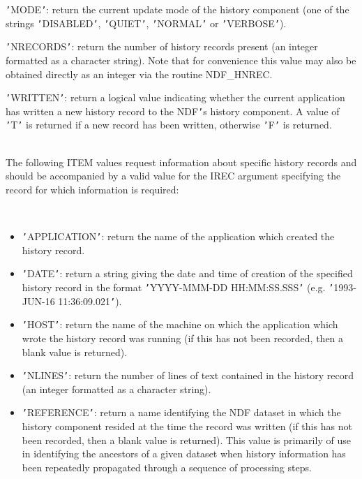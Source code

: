 \documentclass[twoside,11pt]{article}
\newcommand{\htmlref}[2]{#1}
\newcommand{\hi}[1]{{\tt{#1}}}
\newcommand{\sstdiytopic}[2]{\item[{\hspace{-0.35em}#1\hspace{-0.35em}:}]
\mbox{} \\[1.3ex] #2}
\newcommand{\sstitemlist}[1]{
  \mbox{} \\
  \vspace{-3.5ex}
  \begin{itemize}
     #1
  \end{itemize}
}
\newcommand{\sstitem}{\item}
\newcommand{\sstdiytopic}[2]{\item[{#1}] #2 }
\newcommand{\sstitemlist}[1]{
      \begin{itemize}
         #1
      \end{itemize}
      \\
   }
\newcommand{\sstitem}{\item}
\begin{document}
{{{         \sstitem
         \hi{'}MODE\hi{'}: return the current update mode of the history
         component (one of the strings \hi{'}DISABLED\hi{'}, \hi{'}QUIET\hi{'}, \hi{'}NORMAL\hi{'} or
         \hi{'}VERBOSE\hi{'}).

         \sstitem
         \hi{'}NRECORDS\hi{'}: return the number of history records present (an
         integer formatted as a character string). Note that for
         convenience this value may also be obtained directly as an
         integer via the routine \htmlref{NDF\_HNREC}{NDF_HNREC}.

         \sstitem
         \hi{'}WRITTEN\hi{'}: return a logical value indicating whether the
         current application has written a new history record to the NDF\hi{'}s
         history component. A value of \hi{'}T\hi{'} is returned if a new record has
         been written, otherwise \hi{'}F\hi{'} is returned.
      }
   }
   \sstdiytopic{
      Specific Items
   }{
      The following ITEM values request information about specific
      history records and should be accompanied by a valid value for
      the IREC argument specifying the record for which information is
      required:
      \sstitemlist{

         \sstitem
         \hi{'}APPLICATION\hi{'}: return the name of the application which
         created the history record.

         \sstitem
         \hi{'}DATE\hi{'}: return a string giving the date and time of creation
         of the specified history record in the format \hi{'}YYYY-MMM-DD
         HH:MM:SS.SSS\hi{'} (e.g. \hi{'}1993-JUN-16 11:36:09.021\hi{'}).

         \sstitem
         \hi{'}HOST\hi{'}: return the name of the machine on which the
         application which wrote the history record was running (if this
         has not been recorded, then a blank value is returned).

         \sstitem
         \hi{'}NLINES\hi{'}: return the number of lines of text contained in the
         history record (an integer formatted as a character string).

         \sstitem
         \hi{'}REFERENCE\hi{'}: return a name identifying the NDF dataset in which
         the history component resided at the time the record was written
         (if this has not been recorded, then a blank value is returned).
         This value is primarily of use in identifying the ancestors of a
         given dataset when history information has been repeatedly
         propagated through a sequence of processing steps.

}}}
\end{document}
